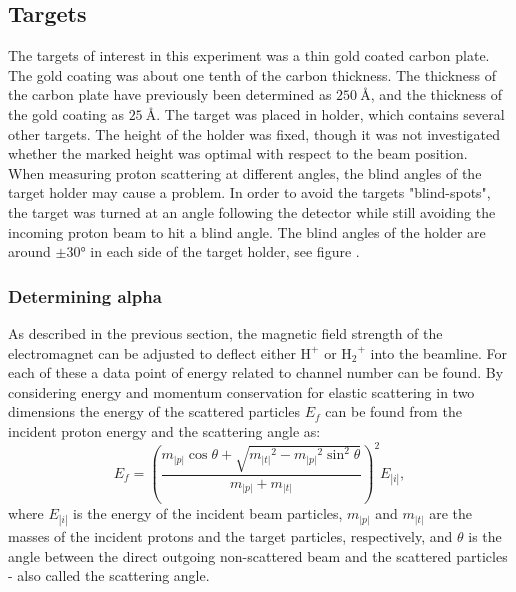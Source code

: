\subsection{Targets}
The targets of interest in this experiment was a thin gold coated carbon plate. The gold coating was about one tenth of the carbon thickness. The thickness of the carbon plate have previously been determined as $\SI{250}{\angstrom}$, and the thickness of the gold coating as $\SI{25}{\angstrom}$.\footnotemark {} 
The target was placed in holder, which contains several other targets. The height of the holder was fixed, though it was not investigated whether the marked height was optimal with respect to the beam position.\\

When measuring proton scattering at different angles, the blind angles of the target holder may cause a problem. In order to avoid the targets "blind-spots", the target was turned at an angle following the detector while still avoiding the incoming proton beam to hit a blind angle. The blind angles of the holder are around $\pm 30 \si{\degree}$ in each side of the target holder, see figure .  
  
\subsubsection{Determining alpha}
As described in the previous section, the magnetic field strength of the
electromagnet can be adjusted to deflect either $\mathrm{H^+}$ or
$\mathrm{{H_2}^+}$ into the beamline. For each of these a data point of energy
related to channel number can be found.
By considering energy and momentum conservation for elastic scattering in two
dimensions the energy of the scattered particles $E_f$ can be found from the
incident proton energy and the scattering angle as:
\begin{equation}
E_f = \left( \frac{m_|p| \cos\theta + \sqrt{{m_|t|}^2 - {m_|p|}^2
\sin^2\theta}}{m_|p|+m_|t|} \right)^2 E_|i|,
\end{equation}
where $E_|i|$ is the energy of the incident beam particles, $m_|p|$ and $m_|t|$ are
the masses of the incident protons and the target particles, respectively, and
$\theta$ is the angle between the direct outgoing non-scattered beam and the
scattered particles - also called the scattering angle.

